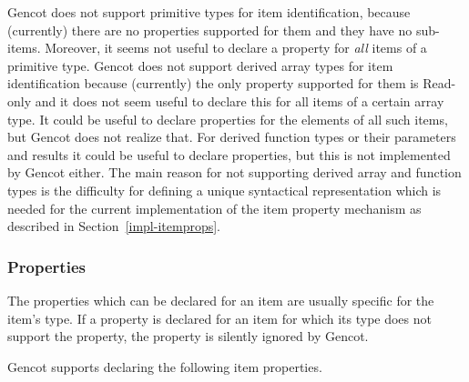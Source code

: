 Gencot does not support primitive types for item identification, because (currently) there are no properties supported
for them and they have no sub-items. Moreover, it seems not useful to declare a property for \textit{all} items of
a primitive type. Gencot does not support derived array types for item identification because (currently) the only 
property supported for them is Read-only and it does not seem useful to declare this for all items of a certain array 
type. It could be useful to declare properties for the elements of all such items, but Gencot does not realize that.
For derived function types or their parameters and results it could be useful to declare properties, but this is not
implemented by Gencot either. The main reason for not supporting derived array and function types is the difficulty
for defining a unique syntactical representation which is needed for the current implementation of the item property
mechanism as described in Section~\ref{impl-itemprops}.

\subsubsection{Properties}

The properties which can be declared for an item are usually specific for the item's type. If a property is declared
for an item for which its type does not support the property, the property is silently ignored by Gencot.

Gencot supports declaring the following item properties.

